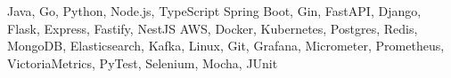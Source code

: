 

\addvspace{-1.5ex}
\begin{cvskills}
    {Java, Go, Python, Node.js, TypeScript}
    {Spring Boot, Gin, FastAPI, Django, Flask, Express, Fastify, NestJS}
    {AWS, Docker, Kubernetes, Postgres, Redis, MongoDB, Elasticsearch, Kafka, Linux, Git, 
    Grafana, Micrometer, Prometheus, VictoriaMetrics, PyTest, Selenium, Mocha, JUnit}
\end{cvskills}